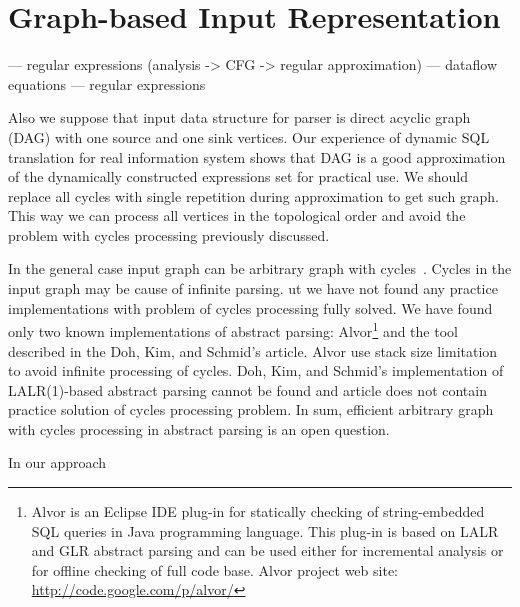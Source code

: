 \section{Graph-based Input Representation}

\cite{StringExpr} --- regular expressions (analysis -> CFG -> regular approximation)
\cite{AbstrParsing} --- dataflow equations
\cite{ALVOR1,ALVOR2} --- regular expressions

Also we suppose that input data structure for parser is direct acyclic graph (DAG) with one source and 
one sink vertices. Our experience of dynamic SQL translation for real information system shows that DAG 
is a good approximation of the dynamically constructed expressions set for practical use. We should replace 
all cycles with single repetition during approximation to get such graph. This way we can process all vertices 
in the topological order and avoid the problem with cycles processing previously discussed.

In the general case input graph can be arbitrary graph with cycles~\cite{AbstrParsing}. Cycles in the input graph may 
be cause of infinite parsing. ut we have not found any practice implementations with problem of cycles processing fully 
solved. We have found only two known implementations of abstract parsing: Alvor\footnote{Alvor is an Eclipse IDE plug-in 
for statically checking of string-embedded SQL queries in Java programming language. This plug-in is based on LALR and GLR 
abstract parsing and can be used either for incremental analysis or for offline checking of full code base. Alvor project 
web site: \href{http://code.google.com/p/alvor/}{http://code.google.com/p/alvor/}} and the tool described in the Doh, Kim, 
and Schmid's article. Alvor use stack size limitation to avoid infinite processing of cycles. Doh, Kim, and Schmid's 
implementation of LALR(1)-based abstract parsing cannot be found and article does not contain practice solution of 
cycles processing problem. In sum, efficient arbitrary graph with cycles processing in abstract parsing is an open question.
	


In our approach 

